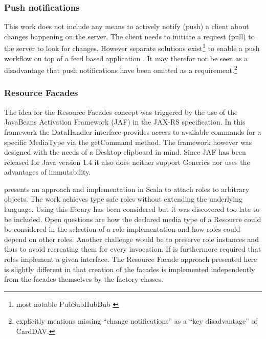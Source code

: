 \documentclass[11pt,a4paper,headsepline,twoside]{scrartcl}		%
\begin{document}

\subsubsection{Push notifications}

This work does not include any means to actively notify (push) a client about
changes happening on the server. The client needs to initiate a request (pull)
to the server to look for changes. However separate solutions
exist\footnote{most notable PubSubHubBub \cite{Fitzpatrick2010}} to enable a push
  workflow on top of a feed based application
  \cite{Wilde:2009:FQP:1693155.1693220}. It may therefor not be seen as a
  disadvantage that push notifications have been omitted as a
  requirement.\footnote{\cite[sec. 1]{RFC6352} explicitly mentions missing
    ``change notifications'' as a ``key disadvantage'' of CardDAV.}

\subsubsection{Resource Facades}
\label{sec:resourcefacadesfuture-work}

The idea for the Resource Facades concept was triggered by the use of the
JavaBeans Activation Framework (JAF)\cite{Calder2006} in the JAX-RS
specification. In this framework the DataHandler interface provides access to
available commands for a specific MediaType via the getCommand method. The
framework however was designed with the needs of a Desktop clipboard in
mind. Since JAF has been released for Java version 1.4 it also does neither
support Generics nor uses the advantages of immutability.

\cite{Pradel2008a} presents an approach and implementation in Scala to attach
roles to arbitrary objects. The work achieves type safe roles without extending
the underlying language. Using this library has been considered but it was
discovered too late to be included. Open questions are how the declared media
type of a Resource could be considered in the selection of a role implementation
and how roles could depend on other roles. Another challenge would be to
preserve role instances and thus to avoid recreating them for every
invocation. If is furthermore required that roles implement a given
interface. The Resource Facade approach presented here is slightly different in
that creation of the facades is implemented independently from the facades
themselves by the factory classes.
\end{document}

